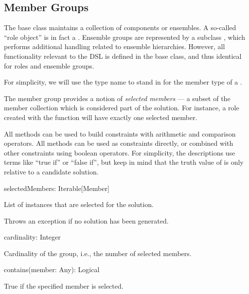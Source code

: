 
\subsection{Member Groups}
\label{dsl:r:membergroups}

The base class  maintains a collection of components or ensembles. A
so-called ``role object'' is in fact a . Ensemble groups
are represented by a subclass , which performs additional handling
related to ensemble hierarchies. However, all functionality relevant to the DSL is
defined in the base class, and thus identical for roles and ensemble groups.

For simplicity, we will use the type name  to stand in for the member type
of a .

The member group provides a notion of \textit{selected members} --- a subset of the
member collection which is considered part of the solution. For instance, a role created
with the  function will have exactly one selected member.

All  methods can be used to build constraints with arithmetic and comparison
operators. All  methods can be used as constraints directly, or combined
with other constraints using boolean operators. For simplicity, the descriptions use
terms like ``true if'' or ``false if'', but keep in mind that the truth value of
 is only relative to a candidate solution.

\begin{dslsig}
selectedMembers: Iterable[Member]
\end{dslsig}
\begin{dsldesc}
    List of  instances that are selected for the solution.

    Throws an exception if no solution has been generated.
\end{dsldesc}

\begin{dslsig}
cardinality: Integer
\end{dslsig}
\begin{dsldesc}
    Cardinality of the group, i.e., the number of selected members.
\end{dsldesc}

\begin{dslsig}
contains(member: Any): Logical
\end{dslsig}
\begin{dsldesc}
    True if the specified member is selected.
\end{dsldesc}

